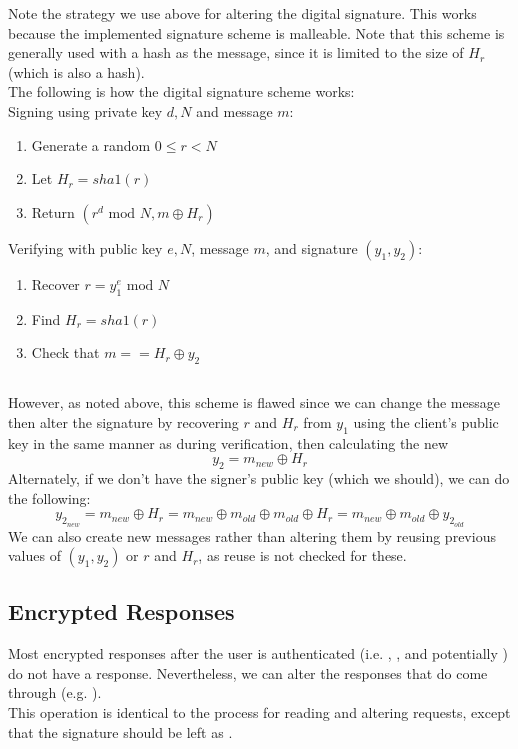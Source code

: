 \documentclass{article}
\newcommand{\code}[1]{\tcbox[
    on line,
    colback=codebackground, boxsep=2pt,
    colframe=white, boxrule=0pt,
    top=0pt, bottom=0pt, left=0pt, right=0pt
]{\texttt{#1}}}
\begin{document}
Note the strategy we use above for altering the digital signature.
This works because the implemented signature scheme is malleable.
Note that this scheme is generally used with a hash as the message,
since it is limited to the size of $H_r$ (which is also a hash). \\
The following is how the digital signature scheme works: \\
Signing using private key $d, N$ and message $m$:
\begin{enumerate}
    \item Generate a random $0 \leq r < N$
    \item Let $H_r = sha1(r)$
    \item Return $(r^d\text{ mod }N, m \oplus H_r)$
\end{enumerate}
Verifying with public key $e, N$, message $m$, and signature $(y_1, y_2)$:
\begin{enumerate}
    \item Recover $r = y_1^e\text{ mod }N$
    \item Find $H_r = sha1(r)$
    \item Check that $m == H_r \oplus y_2$
\end{enumerate}
\subsection*{}
\label{sec:signaturebad}
However, as noted above, this scheme is flawed since we can change the message then alter the signature by recovering
$r$ and $H_r$ from $y_1$ using the client's public key in the same manner as during verification, then calculating the new
\[y_2 = m_{new} \oplus H_r\]
Alternately, if we don't have the signer's public key (which we should), we can do the following:
\[y_{2_{new}} = m_{new} \oplus H_r = m_{new} \oplus m_{old} \oplus m_{old} \oplus H_r = m_{new} \oplus m_{old} \oplus y_{2_{old}}\]
We can also create new messages rather than altering them by reusing previous values of $(y_1, y_2)$ or $r$ and $H_r$, as reuse is not checked for these.

\subsection{Encrypted Responses}
Most encrypted responses after the user is authenticated (i.e. \code{DEPOSIT}, \code{WITHDRAW}, and potentially \code{FREEZE}) do not have a response.
Nevertheless, we can alter the responses that do come through (e.g. \code{CHECK}). \\
This operation is identical to the process for reading and altering requests, except that the signature should be left as \code{null}.
\end{document}
